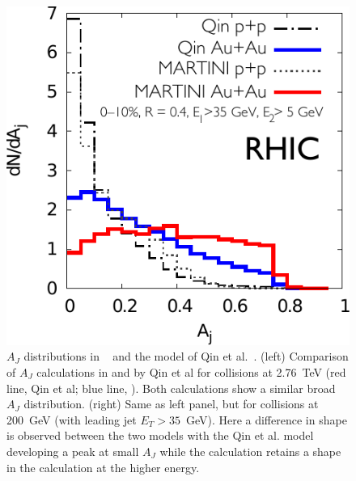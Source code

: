 \begin{figure}[t]
 \begin{center}
    \hfill
    \includegraphics[trim = 0 0 0 0, clip, width=0.47\linewidth]{figs/martini_music_qin_35}
    \caption[$A_J$ distributions in \martinimusic and in the model of
    Qin et al. at LHC and RHIC energies]{\label{fig:martiniaj} $A_J$
      distributions in
      \martinimusic~\protect\cite{Young_privatecomm}{} and the model
      of Qin et al.~\protect\cite{qin_privatecomm}{}.  (left)
      Comparison of $A_J$ calculations in \martinimusic and by Qin et
      al for \pbpb collisions at 2.76~TeV (red line, Qin et al; blue
      line, \martinimusic).  Both calculations show a similar broad
      $A_J$ distribution.  (right) Same as left panel, but for \auau
      collisions at 200~GeV (with leading jet $E_T>35$~GeV).  Here a
      difference in shape is observed between the two models with the
      Qin et al. model developing a peak at small $A_J$ while the
      \martinimusic calculation retains a shape in the calculation at
      the higher energy.}
 \end{center}
\end{figure}

